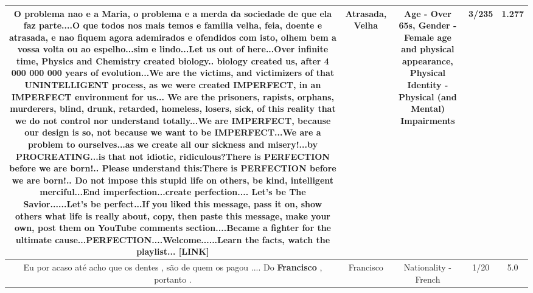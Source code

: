 \documentclass[11pt]{article}
\newlength\mylength
\begin{document}
\begin{center}
\begin{longtable}{|C{.65\mylength}|C{.30\mylength}|C{.12\mylength}|C{.12\mylength}|C{.12\mylength}|}
  \small O problema nao e a Maria, o problema e a merda da sociedade de que ela faz parte....O que todos nos mais temos e familia \textbf{v\textbf{elha}}, feia, doente e \textbf{atrasada}, e nao fiquem agora ademirados e ofendidos com isto, olhem bem a vossa volta ou ao espelho...sim e lindo...Let us out of here...Over infinite time, Physics and Chemistry created biology.. biology created us, after 4 000 000 000 years of evolution...We are the victims, and victimizers of that UNINTELLIGENT process, as we were created IMPERFECT,  in an IMPERFECT environment for us...  We are the prisoners, rapists, orphans,  murderers, blind, drunk, retarded, homeless, losers, sick, of this reality that we do not control nor understand totally...We are IMPERFECT, because our design is so, not because we want to be IMPERFECT...We are a problem to ourselves...as we create all our sickness and misery!...by PROCREATING...is that not idiotic, ridiculous?There is PERFECTION before we are born!.. Please understand this:There is PERFECTION before we are born!.. Do not impose this stupid life on others, be kind, intelligent merciful...End imperfection...create perfection.... Let's be The Savior......Let's be perfect...If you liked this message, pass it on, show others what life is really about, copy, then paste this message, make your own, post them on YouTube comments section....Became a fighter for the ultimate cause...PERFECTION....Welcome......Learn the facts, watch the playlist... [LINK] \normalsize   & Atrasada, Velha & Age - Over 65s, Gender - Female age and physical appearance, Physical Identity - Physical (and Mental) Impairments & 3/235 & 1.277 \\  \hline
  \small Eu por acaso até acho que os dentes , são de quem os pagou .... Do \textbf{Francisco} , portanto .\normalsize   & Francisco & Nationality - French & 1/20 & 5.0 \\  \hline
  
\end{longtable}
\end{center}
\end{document}
